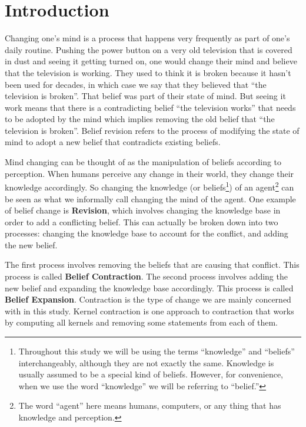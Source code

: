 \chapter{Introduction}

Changing one's mind is a process that happens very frequently as part of one's daily routine. Pushing the power button on a very old television that is covered in dust and seeing it getting turned on, one would change their mind and believe that the television is working. They used to think it is broken because it hasn't been used for decades, in which case we say that they believed that ``the television is broken''. That belief was part of their state of mind. But seeing it work means that there is a contradicting belief ``the television works'' that needs to be adopted by the mind which implies removing the old belief that ``the television is broken''. Belief revision refers to the process of modifying the state of mind to adopt a new belief that contradicts existing beliefs.

Mind changing can be thought of as the manipulation of beliefs according to perception. When humans perceive any change in their world, they change their knowledge accordingly. So changing the knowledge (or beliefs\footnote{Throughout this study we will be using the terms ``knowledge'' and ``beliefs'' interchangeably, although they are not exactly the same. Knowledge is usually assumed to be a special kind of beliefs. However, for convenience, when we use the word ``knowledge'' we will be referring to ``belief.'' }) of an agent\footnote{The word ``agent'' here means humans, computers, or any thing that has knowledge and perception.} can be seen as what we informally call changing the mind of the agent. One example of belief change is \textbf{Revision}, which involves changing the knowledge base in order to add a conflicting belief. This can actually be broken down into two processes: changing the knowledge base to account for the conflict, and adding the new belief. 

The first process involves removing the beliefs that are causing that conflict. This process is called \textbf{Belief Contraction}. The second process involves adding the new belief and expanding the knowledge base accordingly. This process is called \textbf{Belief Expansion}. Contraction is the type of change we are mainly concerned with in this study. Kernel contraction is one approach to contraction that works by computing all kernels and removing some statements from each of them. 

